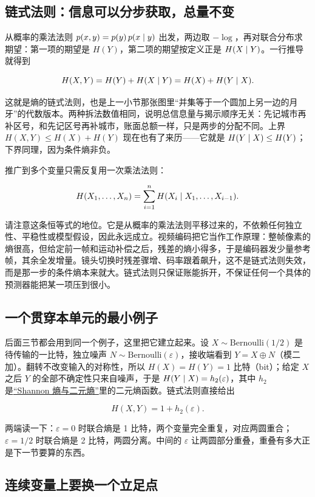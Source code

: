 \subsection{链式法则：信息可以分步获取，总量不变}

从概率的乘法法则 \(p(x,y)=p(y)\,p(x\mid y)\) 出发，两边取 \(-\log\)，再对联合分布求期望：第一项的期望是 \(H(Y)\)，第二项的期望按定义正是 \(H(X\mid Y)\)。一行推导就得到

\[
H(X,Y)=H(Y)+H(X\mid Y)=H(X)+H(Y\mid X).
\]

这就是熵的链式法则，也是上一小节那张图里``并集等于一个圆加上另一边的月牙''的代数版本。两种拆法数值相同，说明总信息量与揭示顺序无关：先记城市再补区号，和先记区号再补城市，账面总额一样，只是两步的分配不同。上界 \(H(X,Y)\le H(X)+H(Y)\) 现在也有了来历——它就是 \(H(Y\mid X)\le H(Y)\)；下界同理，因为条件熵非负。

推广到多个变量只需反复用一次乘法法则：

\[
H(X_1,\ldots,X_n)=\sum_{i=1}^{n} H(X_i\mid X_1,\ldots,X_{i-1}).
\]

请注意这条恒等式的地位。它是从概率的乘法法则平移过来的，不依赖任何独立性、平稳性或模型假设，因此永远成立。视频编码把它当作工作原理：整帧像素的熵很高，但给定前一帧和运动补偿之后，残差的熵小得多，于是编码器发少量参考帧，其余全发增量。镜头切换时残差骤增、码率跟着飙升，这不是链式法则失效，而是那一步的条件熵本来就大。链式法则只保证账能拆开，不保证任何一个具体的预测器能把某一项压到很小。

\subsection{一个贯穿本单元的最小例子}

后面三节都会用到同一个例子，这里把它建立起来。设 \(X\sim\mathrm{Bernoulli}(1/2)\) 是待传输的一比特，独立噪声 \(N\sim\mathrm{Bernoulli}(\varepsilon)\)，接收端看到 \(Y=X\oplus N\)（模二加）。翻转不改变输入的对称性，所以 \(H(X)=H(Y)=1\) 比特（bit）；给定 \(X\) 之后 \(Y\) 的全部不确定性只来自噪声，于是 \(H(Y\mid X)=h_2(\varepsilon)\)，其中 \(h_2\) 是\hyperref[sec:07-Information-Theory/01-Information-and-Entropy/02]{``Shannon 熵与二元熵''}里的二元熵函数。链式法则直接给出

\[
H(X,Y)=1+h_2(\varepsilon).
\]

两端读一下：\(\varepsilon=0\) 时联合熵是 1 比特，两个变量完全重复，对应两圆重合；\(\varepsilon=1/2\) 时联合熵是 2 比特，两圆分离。中间的 \(\varepsilon\) 让两圆部分重叠，重叠有多大正是下一节要算的东西。

\subsection{连续变量上要换一个立足点}

